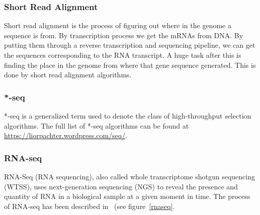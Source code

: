 \subsubsection{Short Read Alignment}

Short read alignment is the process of figuring out where in the genome a sequence is from. By transcription process we get the mRNAs from DNA. By putting them through a reverse transcription and sequencing pipeline, we can get the sequences corresponding to the RNA transcript. A huge task after this is finding the place in the genome from where that gene sequence generated. This is done by short read alignment algorithms.

\subsubsection{*-seq}
*-seq is a generalized term used to denote the class of high-throughput selection algorithms. The full list of *-seq algorithms can be found at \url{https://liorpachter.wordpress.com/seq/}.

\subsubsection{RNA-seq}
RNA-Seq (RNA sequencing), also called whole transcriptome shotgun sequencing  (WTSS), uses next-generation sequencing (NGS) to reveal the presence and quantity of RNA in a biological sample at a given moment in time. The process of RNA-seq has been described in~\cite{wiki:rnaseq} (see figure~\ref{rnaseq}.

